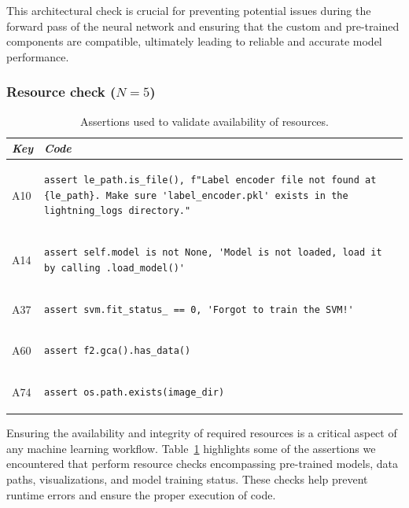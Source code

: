 This architectural check is crucial for preventing potential issues during the forward pass of the neural network and ensuring that the custom and pre-trained components are compatible, ultimately leading to reliable and accurate model performance.

\subsubsection{Resource check ($N = 5$)}

\begin{table}
\centering
\begin{tabular}{@{}m{} m{}@{}}
\toprule
\emph{\textbf{Key}}&
\emph{\textbf{Code}}\\
\midrule

A10 &
\begin{lstlisting}
assert le_path.is_file(), f"Label encoder file not found at {le_path}. Make sure 'label_encoder.pkl' exists in the lightning_logs directory."
\end{lstlisting}\\

A14 &
\begin{lstlisting}
assert self.model is not None, 'Model is not loaded, load it by calling .load_model()'
\end{lstlisting}\\

A37 &
\begin{lstlisting}
assert svm.fit_status_ == 0, 'Forgot to train the SVM!'
\end{lstlisting}\\

A60 &
\begin{lstlisting}
assert f2.gca().has_data()
\end{lstlisting}\\

A74 &
\begin{lstlisting}
assert os.path.exists(image_dir)
\end{lstlisting}\\
\end{tabular}
\caption{Assertions used to validate availability of resources.}
\label{tab:resource-check-explicit}
\end{table}

Ensuring the availability and integrity of required resources is a critical aspect of any machine learning workflow. Table~\ref{tab:resource-check-explicit} highlights some of the assertions we encountered that perform resource checks encompassing pre-trained models, data paths, visualizations, and model training status. These checks help prevent runtime errors and ensure the proper execution of code.

